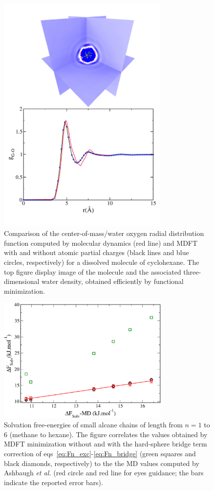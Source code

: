 \documentclass[aip,jcp,preprint]{revtex4-1}
\begin{document}
\begin{figure}
    \includegraphics[width=8.5cm]{cyclohexane_g_and_dens.pdf}
    \caption{
        \label{fig:gr_cyclohexane}
        Comparison of the center-of-mass/water oxygen radial distribution function computed by molecular dynamics (red line) and MDFT
        with and without atomic partial charges (black lines and blue circles, respectively) for a dissolved molecule of cyclohexane. The top figure display image of the molecule and the associated three-dimensional water density, obtained efficiently by functional minimization.
        }
\end{figure}

\begin{figure}
    \includegraphics[width=8.5cm]{enercomp_alcanes_MD_MDFT.pdf}
    \caption{
        \label{fig:free_energies_alcanes}
        Solvation free-energies of small alcane chains of length from $n=1$ to 6 (methane to hexane). The figure correlates the values obtained by MDFT minimization without and with the hard-sphere bridge term correction of  eqs~\ref{eq:Fn_exc}-\ref{eq:Fn_bridge} (green squares and black diamonds, respectively) to the the MD values computed by Ashbaugh {\em et al.}\cite{ashbaugh_hydration_1998} (red circle and red line for eyes guidance; the bars indicate the reported error bars).         }
\end{figure}
\end{document}
